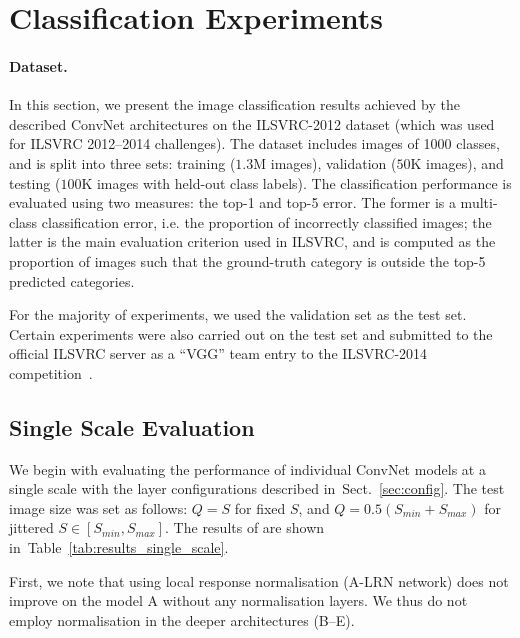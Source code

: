 \documentclass{article} %
\makeatletter
\newcommand{\tblref}[1]{Table~\ref{#1}}
\newcommand{\sref}[1]{Sect.~\ref{#1}}
\newcommand*{\ie}{i.e.\@\xspace}
\makeatother
\begin{document}
\section{Classification Experiments}
\label{sec:exp}

\paragraph{Dataset.}
In this section, we present the image classification results achieved by the described ConvNet architectures on the ILSVRC-2012 dataset (which was used for ILSVRC 2012--2014 challenges).
The dataset includes images of 1000 classes, and is split into three sets: training ($1.3$M images), validation ($50$K images), and testing ($100$K images with held-out class labels).
The classification performance is evaluated using two measures: the top-1 and top-5 error. The former is a multi-class classification error, \ie the proportion of incorrectly
classified images; the latter is the main evaluation criterion used in ILSVRC, and is computed as the proportion of images such that the ground-truth category is outside the top-5 predicted categories.

For the majority of experiments, we used the validation set as the test set. Certain experiments were also carried out on the test set and submitted to the official ILSVRC server 
as a ``VGG'' team entry to the ILSVRC-2014 competition~\citep{Russakovsky14}.

\subsection{Single Scale Evaluation}

We begin with evaluating the performance of individual ConvNet models at a single scale with the layer configurations described in~\sref{sec:config}.
The test image size was set as follows: $Q=S$ for fixed $S$, and $Q=0.5(S_{min}+S_{max})$ for jittered $S \in \left[S_{min},S_{max}\right]$.
The results of are shown in~\tblref{tab:results_single_scale}.

First, we note that using local response normalisation (A-LRN network) does not improve on the model A
without any normalisation layers. We thus do not employ normalisation in the deeper architectures (B--E).
\end{document}
